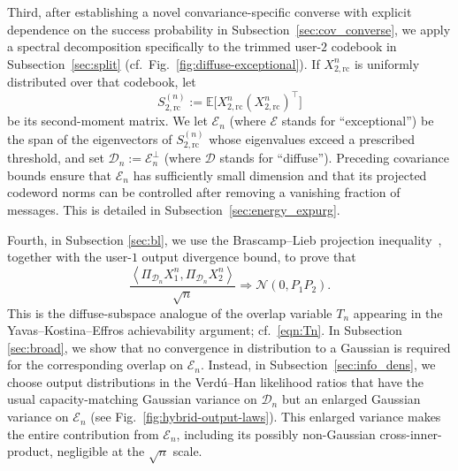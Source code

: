 \documentclass[11pt,onecolumn]{IEEEtran}
\newcommand{\calD}{\mathcal{D}}
\newcommand{\calE}{\mathcal{E}}
\newcommand{\rc}{\mathrm{rc}}
\begin{document}
Third,  after establishing a novel convariance-specific converse with explicit dependence on the  success probability in Subsection~\ref{sec:cov_converse}, we apply a spectral decomposition specifically to the
trimmed user-$2$ codebook in Subsection~\ref{sec:split}  (cf.\ Fig.~\ref{fig:diffuse-exceptional}). If $X_{2,\rc}^n$ is uniformly
distributed over that codebook, let
\begin{equation}
S_{2,\rc}^{(n)}
:=\mathbb E \big[
X_{2,\rc}^n(X_{2,\rc}^n)^\top\big]
\end{equation}
be its second-moment matrix.
We let $\mathcal E_n$ (where $\calE$ stands for ``exceptional'') be the span of the eigenvectors of
$S_{2,\rc}^{(n)}$ whose eigenvalues exceed a prescribed threshold,
and set $\mathcal D_n:=\mathcal E_n^\perp$ (where $\calD$ stands for ``diffuse''). 
Preceding covariance bounds ensure that $\mathcal E_n$ has sufficiently small dimension and that its projected codeword norms can be controlled after removing a vanishing fraction of messages. This is detailed in Subsection~\ref{sec:energy_expurg}. 

Fourth, in Subsection \ref{sec:bl}, we use  the Brascamp--Lieb projection
inequality~\cite{CarlenCorderoErausquin2009,LiuCourtadeCuffVerdu2016}, together with the user-$1$ output divergence bound, to prove that 
\begin{equation}
\frac{\left\langle
\Pi_{\mathcal D_n}X_1^n,\Pi_{\mathcal D_n}X_2^n
\right\rangle}{\sqrt n}
\Rightarrow \mathcal N(0,P_1P_2).
\end{equation}
This is the diffuse-subspace analogue of the overlap variable $T_n$
appearing in the Yavas--Kostina--Effros achievability argument;  cf.\ \eqref{eqn:Tn}. In Subsection \ref{sec:broad}, we show that no convergence in distribution to a Gaussian  is required
for the corresponding overlap on $\mathcal E_n$. Instead, in Subsection~\ref{sec:info_dens}, we choose  output distributions in the
Verd\'u--Han likelihood ratios 
that have the usual capacity-matching Gaussian variance on
$\mathcal D_n$ but an enlarged Gaussian variance on $\mathcal E_n$ (see Fig.~\ref{fig:hybrid-output-laws}).
This enlarged variance makes the entire contribution from
$\mathcal E_n$, including its possibly non-Gaussian cross-inner-product,
negligible at the $\sqrt n$ scale. 
\end{document}

